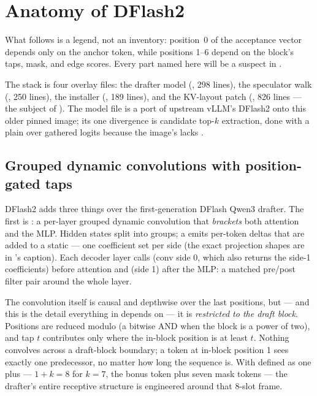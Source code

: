\section{Anatomy of DFlash2}
\label{sec:dflash2-anatomy}

What follows is a legend, not an inventory: position~0 of the acceptance
vector depends only on the anchor token, while positions 1--6 depend on the
block's taps, mask, and edge scores. Every part named here will be a
suspect in .

The stack is four overlay files: the drafter model
(, 298 lines), the speculator walk
(, 250 lines), the installer
(, 189 lines), and the KV-layout patch
(, 826 lines --- the subject of
). The model file is a port of upstream vLLM's
DFlash2 onto this older pinned image; its one divergence is candidate
top-$k$ extraction, done with a plain  over gathered logits
because the image's  lacks .

\subsection{Grouped dynamic convolutions with position-gated taps}

DFlash2 adds three things over the first-generation DFlash Qwen3 drafter.
The first is : a per-layer grouped dynamic
convolution that \emph{brackets} both attention and the MLP. Hidden states
split into  groups; a
 emits per-token deltas that are added to a static
 --- one coefficient set per side (the exact projection
shapes are in 's caption). Each decoder layer calls  (conv
side 0, which also returns the side-1 coefficients) before attention and
 (side 1) after the MLP: a matched pre/post filter pair
around the whole layer.

The convolution itself is causal and depthwise over the last
 positions, but --- and this is the detail everything in
 depends on --- it is \emph{restricted to the
draft block}. Positions are reduced modulo  (a bitwise AND
when the block is a power of two), and tap $t$ contributes only where the
in-block position is at least $t$. Nothing convolves across a draft-block
boundary; a token at in-block position 1 sees exactly one predecessor, no
matter how long the sequence is. With  defined as one plus
 --- $1 + k = 8$ for $k{=}7$, the bonus token
plus seven mask tokens --- the drafter's entire receptive structure is
engineered around that 8-slot frame.

